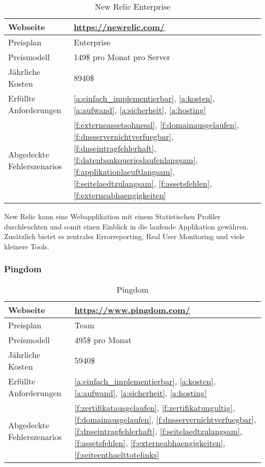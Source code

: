 \begin{table}[H]
  \centering
  \begin{tabular}{p{5cm} p{7cm}}
  \toprule
    Webseite & \url{https://newrelic.com/}\\
  \hline
    Preisplan & Enterprise\\
  \hline
    Preismodell & 149\$ pro Monat pro Server\\
  \hline
    Jährliche Kosten & 8940\$\\
  \hline
    Erfüllte Anforderungen & \ref{a:einfach_implementierbar}, \ref{a:kosten}, \ref{a:aufwand}, \ref{a:sicherheit}, \ref{a:hosting}\\
  \hline
    Abgedeckte Fehlerszenarios & \ref{f:externeassetsohnessl}, \ref{f:domainausgelaufen}, \ref{f:dnsservernichtverfuegbar}, \ref{f:dnseintragfehlerhaft}, \ref{f:datenbankquerieslaufenlangsam}, \ref{f:applikationlaeuftlangsam}, \ref{f:seitelaedtzulangsam}, \ref{f:assetsfehlen}, \ref{f:externeabhaengigkeiten}\\
  \bottomrule
  \end{tabular}
  \caption{New Relic Enterprise}
  \label{tab:new_relic_enterprise}
\end{table}

New Relic kann eine Webapplikation mit einem Statistischen Profiler durchleuchten und somit einen Einblick in die laufende Applikation gewähren. Zusätzlich bietet es zentrales Errorreporting, Real User Monitoring und viele kleinere Tools.

\subsubsection{Pingdom}
\label{ssub:pingdom}

\begin{table}[H]
  \centering
  \begin{tabular}{p{5cm} p{7cm}}
  \toprule
    Webseite & \url{https://www.pingdom.com/}\\
  \hline
    Preisplan & Team\\
  \hline
    Preismodell & 495\$ pro Monat\\
  \hline
    Jährliche Kosten & 5940\$\\
  \hline
    Erfüllte Anforderungen & \ref{a:einfach_implementierbar}, \ref{a:kosten}, \ref{a:aufwand}, \ref{a:sicherheit}, \ref{a:hosting}\\
  \hline
    Abgedeckte Fehlerszenarios & \ref{f:zertifikatausgelaufen}, \ref{f:zertifikatungultig}, \ref{f:domainausgelaufen}, \ref{f:dnsservernichtverfuegbar}, \ref{f:dnseintragfehlerhaft}, \ref{f:seitelaedtzulangsam}, \ref{f:assetsfehlen}, \ref{f:externeabhaengigkeiten}, \ref{f:seiteenthaelttotelinks}\\
  \bottomrule
  \end{tabular}
  \caption{Pingdom}
  \label{tab:pingdom}
\end{table}

